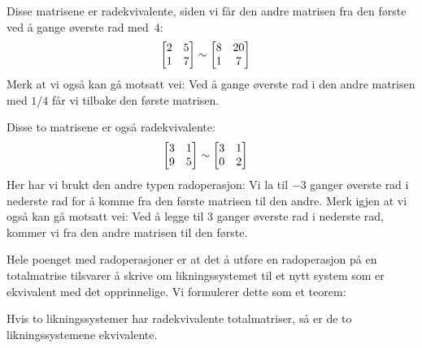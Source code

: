 \begin{ex}
\label{ex:radekvivalent}
Disse matrisene er radekvivalente, siden vi får den andre matrisen fra
den første ved å gange øverste rad med~$4$:
\begin{align*}
\begin{bmatrix}
 2 & 5 \\
 1 & 7
\end{bmatrix}
&\sim
\begin{bmatrix}
 8 & 20 \\
 1 &  7
\end{bmatrix}
\end{align*}
Merk at vi også kan gå motsatt vei: Ved å gange øverste rad i den
andre matrisen med $1/4$ får vi tilbake den første matrisen.

Disse to matrisene er også radekvivalente:
\begin{align*}
\begin{bmatrix}
 3 & 1 \\
 9 & 5
\end{bmatrix}
&\sim
\begin{bmatrix}
 3 & 1 \\
 0 & 2
\end{bmatrix}
\end{align*}
Her har vi brukt den andre typen radoperasjon: Vi la til $-3$ ganger
øverste rad i nederste rad for å komme fra den første matrisen til den
andre.  Merk igjen at vi også kan gå motsatt vei: Ved å legge til $3$
ganger øverste rad i nederste rad, kommer vi fra den andre matrisen
til den første.
\end{ex}

Hele poenget med radoperasjoner er at det å utføre en radoperasjon på
en totalmatrise tilsvarer å skrive om likningssystemet til et nytt
system som er ekvivalent med det opprinnelige.  Vi formulerer dette
som et teorem:

\begin{thm}
Hvis to likningssystemer har radekvivalente totalmatriser, så er de to
likningssystemene ekvivalente.
\end{thm}

